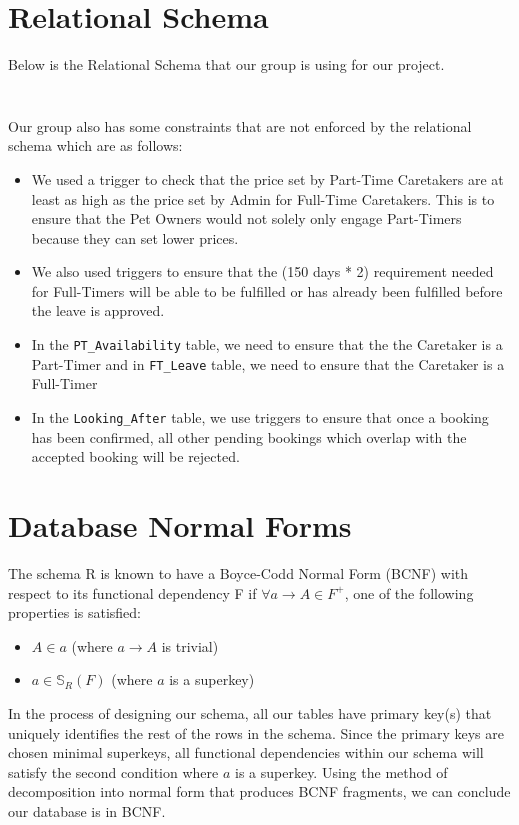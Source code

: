 \documentclass[10pt]{article}
\begin{document}
\newpage


\section{Relational Schema}
Below is the Relational Schema that our group is using for our project. 
\newline
\inputminted[breaklines, tabsize=8, obeytabs, fontsize=\footnotesize]{postgresql}{./codes/init_part1.sql}
\newpage
\inputminted[breaklines, tabsize=8, obeytabs, fontsize=\footnotesize]{postgresql}{./codes/init_part2.sql}

Our group also has some constraints that are not enforced by the relational schema which are as follows:
\begin{itemize}
    \item We used a trigger to check that the price set by Part-Time Caretakers are at least as high as the price set by Admin for Full-Time Caretakers. This is to ensure that the Pet Owners would not solely only engage Part-Timers because they can set lower prices.
    \item We also used triggers to ensure that the (150 days * 2) requirement needed for Full-Timers will be able to be fulfilled or has already been fulfilled before the leave is approved.
    \item In the \texttt{PT\_Availability} table, we need to ensure that the the Caretaker is a Part-Timer and in \texttt{FT\_Leave} table, we need to ensure that the Caretaker is a Full-Timer
    \item In the \texttt{Looking\_After} table, we use triggers to ensure that once a booking has been confirmed, all other pending bookings which overlap with the accepted booking will be rejected. 
\end{itemize}


\section{Database Normal Forms}
The schema R is known to have a Boyce-Codd Normal Form (BCNF) with respect to its functional dependency F if \(\forall a \rightarrow A \in F^+\), one of the following properties is satisfied:
\begin{itemize}
    \item \(A \in a\) (where \(a \rightarrow A\) is trivial)
    \item \(a \in \mathbb{S}_R(F)\) (where \(a\) is a superkey) 
\end{itemize}
In the process of designing our schema, all our tables have primary key(s) that uniquely identifies the rest of the rows in the schema. Since the primary keys are chosen minimal superkeys, all functional dependencies within our schema will satisfy the second condition where $a$ is a superkey. Using the method of decomposition into normal form that produces BCNF fragments, we can conclude our database is in BCNF.
\end{document}
